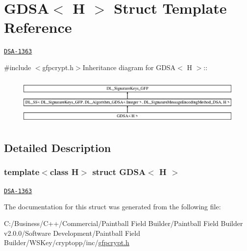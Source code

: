 \hypertarget{struct_g_d_s_a}{
\section{GDSA$<$ H $>$ Struct Template Reference}
\label{struct_g_d_s_a}
}


\href{http://www.weidai.com/scan-mirror/sig.html#DSA-1363}{\tt DSA-\/1363}  


{\ttfamily \#include $<$gfpcrypt.h$>$}Inheritance diagram for GDSA$<$ H $>$::\begin{figure}[H]
\begin{center}
\leavevmode
\includegraphics[height=2.42424cm]{struct_g_d_s_a}
\end{center}
\end{figure}


\subsection{Detailed Description}
\subsubsection*{template$<$class H$>$ struct GDSA$<$ H $>$}

\href{http://www.weidai.com/scan-mirror/sig.html#DSA-1363}{\tt DSA-\/1363} 

The documentation for this struct was generated from the following file:\begin{DoxyCompactItemize}
\item 
C:/Business/C++/Commercial/Paintball Field Builder/Paintball Field Builder v2.0.0/Software Development/Paintball Field Builder/WSKey/cryptopp/inc/\hyperlink{gfpcrypt_8h}{gfpcrypt.h}\end{DoxyCompactItemize}
